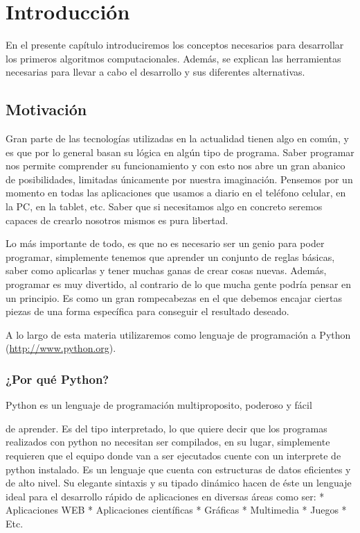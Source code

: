 \documentclass[a4paper,12pt,spanish]{sphinxmanual}
\begin{document}
\chapter{Introducción}
\label{Unidad01:introduccion}\label{Unidad01::doc}\label{Unidad01:introduccion-al-desarrollo-de-software}
En el presente capítulo introduciremos los conceptos necesarios para
desarrollar los primeros algoritmos computacionales. Además, se explican
las herramientas necesarias para llevar a cabo el desarrollo y sus
diferentes alternativas.


\section{Motivación}
\label{Unidad01:motivacion}
Gran parte de las tecnologías utilizadas en la actualidad tienen algo en
común, y es que por lo general basan su lógica en algún tipo de
programa. Saber programar nos permite comprender su funcionamiento y con
esto nos abre un gran abanico de posibilidades, limitadas únicamente por
nuestra imaginación. Pensemos por un momento en todas las aplicaciones
que usamos a diario en el teléfono celular, en la PC, en la tablet, etc.
Saber que si necesitamos algo en concreto seremos capaces de crearlo
nosotros mismos es pura libertad.

Lo más importante de todo, es que no es necesario ser un genio para
poder programar, simplemente tenemos que aprender un conjunto de reglas
básicas, saber como aplicarlas y tener muchas ganas de crear cosas
nuevas. Además, programar es muy divertido, al contrario de lo que mucha
gente podría pensar en un principio. Es como un gran rompecabezas en el
que debemos encajar ciertas piezas de una forma específica para
conseguir el resultado deseado.

A lo largo de esta materia utilizaremos como lenguaje de programación a
Python (\href{http://www.python.org}{http://www.python.org}).


\subsection{¿Por qué Python?}
\label{Unidad01:por-que-python}
\begin{DUlineblock}{0em}
\item[] Python es un lenguaje de programación multiproposito, poderoso y fácil
\end{DUlineblock}

de aprender. Es del tipo interpretado, lo que quiere decir que los
programas realizados con python no necesitan ser compilados, en su
lugar, simplemente requieren que el equipo donde van a ser ejecutados
cuente con un interprete de python instalado. Es un lenguaje que cuenta
con estructuras de datos eficientes y de alto nivel. Su elegante
sintaxis y su tipado dinámico hacen de éste un lenguaje ideal para el
desarrollo rápido de aplicaciones en diversas áreas como ser: *
Aplicaciones WEB * Aplicaciones científicas * Gráficas * Multimedia
* Juegos
\textbar{} * Etc.
\end{document}
